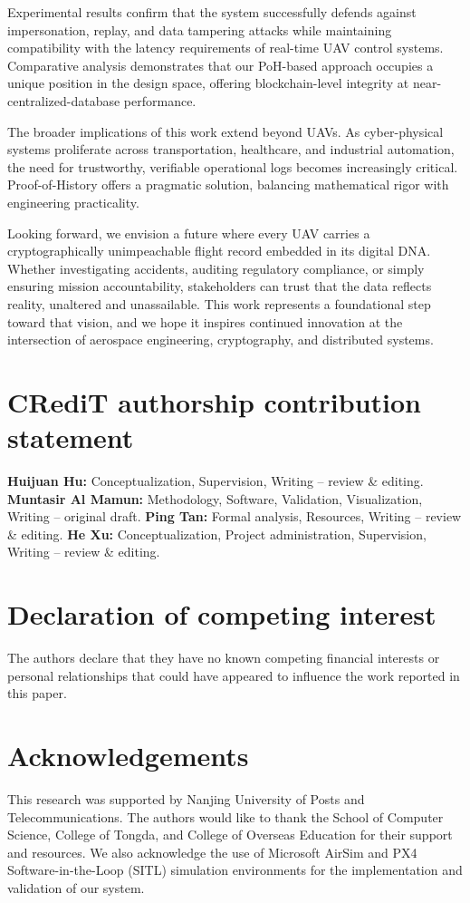 \documentclass[preprint,12pt]{elsarticle}
\begin{document}
Experimental results confirm that the system successfully defends against impersonation, replay, and data tampering attacks while maintaining compatibility with the latency requirements of real-time UAV control systems. Comparative analysis demonstrates that our PoH-based approach occupies a unique position in the design space, offering blockchain-level integrity at near-centralized-database performance.

The broader implications of this work extend beyond UAVs. As cyber-physical systems proliferate across transportation, healthcare, and industrial automation, the need for trustworthy, verifiable operational logs becomes increasingly critical. Proof-of-History offers a pragmatic solution, balancing mathematical rigor with engineering practicality.

Looking forward, we envision a future where every UAV carries a cryptographically unimpeachable flight record embedded in its digital DNA. Whether investigating accidents, auditing regulatory compliance, or simply ensuring mission accountability, stakeholders can trust that the data reflects reality, unaltered and unassailable. This work represents a foundational step toward that vision, and we hope it inspires continued innovation at the intersection of aerospace engineering, cryptography, and distributed systems.

\section*{CRediT authorship contribution statement}
\textbf{Huijuan Hu:} Conceptualization, Supervision, Writing -- review \& editing.
\textbf{Muntasir Al Mamun:} Methodology, Software, Validation, Visualization, Writing -- original draft.
\textbf{Ping Tan:} Formal analysis, Resources, Writing -- review \& editing.
\textbf{He Xu:} Conceptualization, Project administration, Supervision, Writing -- review \& editing.

\section*{Declaration of competing interest}
The authors declare that they have no known competing financial interests or personal relationships that could have appeared to influence the work reported in this paper.

\section*{Acknowledgements}
This research was supported by Nanjing University of Posts and Telecommunications. The authors would like to thank the School of Computer Science, College of Tongda, and College of Overseas Education for their support and resources. We also acknowledge the use of Microsoft AirSim and PX4 Software-in-the-Loop (SITL) simulation environments for the implementation and validation of our system.
\end{document}
